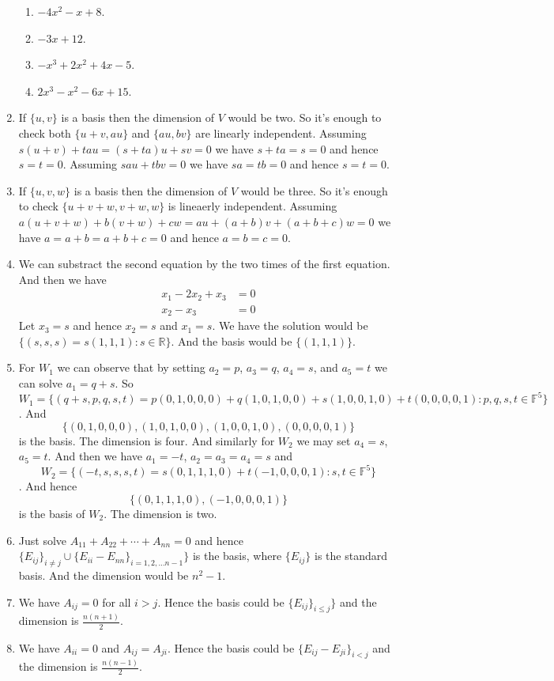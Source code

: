\begin{enumerate}
\begin{enumerate}
\item $-4x^2-x+8$.
\item $-3x+12$.
\item $-x^3+2x^2+4x-5$.
\item $2x^3-x^2-6x+15$.
\end{enumerate}
\item If $\{u,v\}$ is a basis then the dimension of $V$ would be two. So it's enough to check both $\{u+v,au\}$ and $\{au,bv\}$ are linearly independent. Assuming $s(u+v)+tau=(s+ta)u+sv=0$ we have $s+ta=s=0$ and hence $s=t=0$. Assuming $sau+tbv=0$ we have $sa=tb=0$ and hence $s=t=0$.
\item If $\{u,v,w\}$ is a basis then the dimension of $V$ would be three. So it's enough to check $\{u+v+w,v+w,w\}$ is lineaerly independent. Assuming $a(u+v+w)+b(v+w)+cw=au+(a+b)v+(a+b+c)w=0$ we have $a=a+b=a+b+c=0$ and hence $a=b=c=0$.
\item We can substract the second equation by the two times of the first equation. And then we have 
\begin{align*}
x_1-2x_2+x_3&=0\\
x_2-x_3&=0
\end{align*}
Let $x_3=s$ and hence $x_2=s$ and $x_1=s$. We have the solution would be $\{(s,s,s)=s(1,1,1):s\in \mathbb{R}\}$. And the basis would be $\{(1,1,1)\}$.
\item For $W_1$ we can observe that by setting $a_2=p$, $a_3=q$, $a_4=s$, and $a_5=t$ we can solve $a_1=q+s$. So $W_1=\{(q+s,p,q,s,t)=p(0,1,0,0,0)+q(1,0,1,0,0)+s(1,0,0,1,0)+t(0,0,0,0,1):p,q,s,t\in \mathbb{F}^5\}$. And \[\{(0,1,0,0,0),(1,0,1,0,0),(1,0,0,1,0),(0,0,0,0,1)\}\] is the basis. The dimension is four. And similarly for $W_2$ we may set $a_4=s$, $a_5=t$. And then we have $a_1=-t$, $a_2=a_3=a_4=s$ and \[W_2=\{(-t,s,s,s,t)=s(0,1,1,1,0)+t(-1,0,0,0,1):s,t\in \mathbb{F}^5\}\]. And hence \[\{(0,1,1,1,0),(-1,0,0,0,1)\}\] is the basis of $W_2$. The dimension is two.
\item Just solve $A_{11}+A_{22}+\cdots +A_{nn}=0$ and hence $\{E_{ij}\}_{i\neq j}\cup \{E_{ii}-E_{nn}\}_{i=1,2,\ldots n-1}\}$ is the basis, where $\{E_{ij}\}$ is the standard basis. And the dimension would be $n^2-1$.
\item We have $A_{ij}=0$ for all $i>j$. Hence the basis could be $\{E_{ij}\}_{i\leq j}\}$ and the dimension is $\frac{n(n+1)}{2}$.
\item We have $A_{ii}=0$ and $A_{ij}=A_{ji}$. Hence the basis could be $\{E_{ij}-E_{ji}\}_{i<j}$ and the dimension is $\frac{n(n-1)}{2}$.

\end{enumerate}
